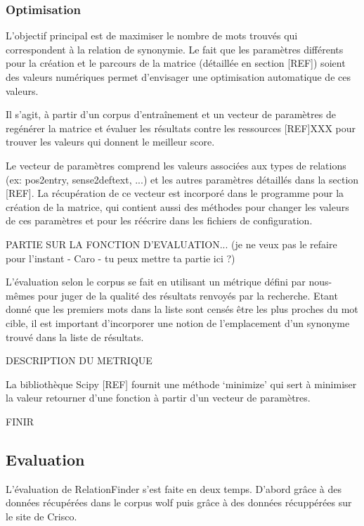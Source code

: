\subsubsection{Optimisation}

L'objectif principal est de maximiser le nombre de mots trouvés qui correspondent à la relation de synonymie. Le fait que les paramètres différents pour la création et le parcours de la matrice (détaillée en section [REF]) soient des valeurs numériques permet d'envisager une optimisation automatique de ces valeurs.

Il s'agit, à partir d'un corpus d'entraînement et un vecteur de paramètres de regénérer la matrice et évaluer les résultats contre les ressources [REF]XXX pour trouver les valeurs qui donnent le meilleur score.

Le vecteur de paramètres comprend les valeurs associées aux types de relations (ex: pos2entry, sense2deftext, ...) et les autres paramètres détaillés dans la section [REF]. La récupération de ce vecteur est incorporé dans le programme pour la création de la matrice, qui contient aussi des méthodes pour changer les valeurs de ces paramètres et pour les réécrire dans les fichiers de configuration.

PARTIE SUR LA FONCTION D'EVALUATION... (je ne veux pas le refaire pour l'instant - Caro - tu peux mettre ta partie ici ?)

L'évaluation selon le corpus se fait en utilisant un métrique défini par nous-mêmes pour juger de la qualité des résultats renvoyés par la recherche. Etant donné que les premiers mots dans la liste sont censés être les plus proches du mot cible, il est important d'incorporer une notion de l'emplacement d'un synonyme trouvé dans la liste de résultats.

DESCRIPTION DU METRIQUE

La bibliothèque Scipy [REF] fournit une méthode \lq{minimize}\rq{} qui sert à minimiser la valeur retourner d'une fonction à partir d'un vecteur de paramètres.

FINIR



\subsection{Evaluation}

L'évaluation de RelationFinder s'est faite en deux temps. D'abord grâce à des 
données récupérées dans le corpus wolf puis grâce à des données récuppérées sur 
le site de Crisco.

